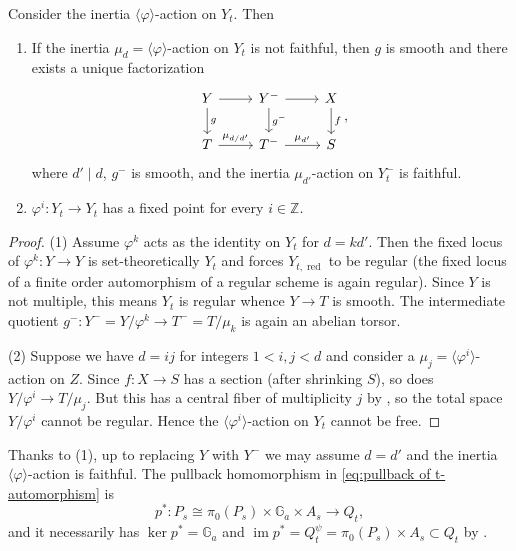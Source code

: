 \documentclass[reqno, letterpaper]{amsart}
\numberwithin{equation}{subsection}
\let\to\longrightarrow
\newcommand{\GG}{\mathbb{G}}
\newcommand{\ZZ}{\mathbb{Z}}
\DeclareMathOperator{\im}{im}
\DeclareMathOperator{\red}{red}
\begin{document}
		\begin{lemma} \label{lem:inertia action is faithful}
			Consider the inertia $\langle \varphi \rangle$-action on $Y_t$. Then
			\begin{enumerate}
				\item If the inertia $\mu_d = \langle \varphi \rangle$-action on $Y_t$ is not faithful, then $g$ is smooth and there exists a unique factorization
				\[\begin{tikzcd}[column sep=normal]
					Y \arrow[r] \arrow[d, "g"] & Y^- \arrow[r] \arrow[d, "g^-"] & X \arrow[d, "f"] \\
					T \arrow[r, "\mu_{d/d'}"] & T^- \arrow[r, "\mu_{d'}"] & S
				\end{tikzcd},\]
				where $d' \mid d$, $g^-$ is smooth, and the inertia $\mu_{d'}$-action on $Y^-_t$ is faithful.
				
				\item $\varphi^i : Y_t \to Y_t$ has a fixed point for every $i \in \ZZ$.
			\end{enumerate}
		\end{lemma}
		\begin{proof}
			(1) Assume $\varphi^k$ acts as the identity on $Y_t$ for $d = kd'$. Then the fixed locus of $\varphi^k : Y \to Y$ is set-theoretically $Y_t$ and forces $Y_{t, \red}$ to be regular (the fixed locus of a finite order automorphism of a regular scheme is again regular). Since $Y$ is not multiple, this means $Y_t$ is regular whence $Y \to T$ is smooth. The intermediate quotient $g^- : Y^- = Y / \varphi^k \to T^- = T/\mu_k$ is again an abelian torsor.
			
			(2) Suppose we have $d = ij$ for integers $1 < i, j < d$ and consider a $\mu_j = \langle \varphi^i \rangle$-action on $Z$. Since $f : X \to S$ has a section (after shrinking $S$), so does $Y / \varphi^i \to T/\mu_j$. But this has a central fiber of multiplicity $j$ by , so the total space $Y / \varphi^i$ cannot be regular. Hence the $\langle \varphi^i \rangle$-action on $Y_t$ cannot be free.
		\end{proof}
		
		Thanks to (1), up to replacing $Y$ with $Y^-$ we may assume $d = d'$ and the inertia $\langle \varphi \rangle$-action is faithful. The pullback homomorphism in \eqref{eq:pullback of t-automorphism} is
		\begin{equation} \label{eq:prop:semistable reduction theorem for unstable}
			p^* : P_s \cong \pi_0(P_s) \times \GG_a \times A_s \to Q_t ,
		\end{equation}
		and it necessarily has $\ker p^* = \GG_a$ and $\im p^* = Q_t^\psi = \pi_0(P_s) \times A_s \subset Q_t$ by .
		
\end{document}
